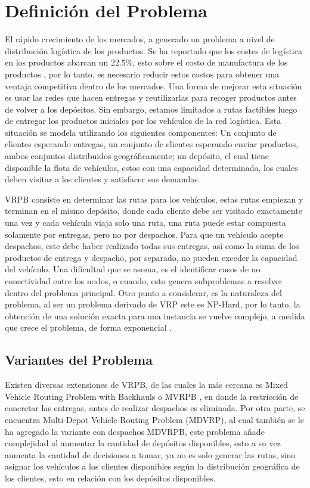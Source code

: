 \documentclass[letter, 10pt]{article}
\begin{document}
\section{Definición del Problema}
El rápido crecimiento de los mercados, a generado un problema a nivel de distribución logística de los productos. Se ha reportado que los costes de logística en los productos abarcan un 22.5\%, esto sobre el costo de manufactura de los productos \cite{kearney1984measuring}, por lo tanto, es necesario reducir estos costos para obtener una ventaja competitiva dentro de los mercados. Una forma de mejorar esta situación es usar las redes que hacen entregas y reutilizarlas para recoger productos antes de volver a los depósitos. Sin embargo, estamos limitados a rutas factibles luego de entregar los productos iniciales por los vehículos de la red logística. Esta situación se modela utilizando los siguientes componentes: Un conjunto de clientes esperando entregas, un conjunto de clientes esperando enviar productos, ambos conjuntos distribuidos geográficamente; un depósito, el cual tiene disponible la flota de vehículos, estos con una capacidad determinada, los cuales deben visitar a los clientes y satisfacer sus demandas.
\\\par
VRPB consiste en determinar las rutas para los vehículos, estas rutas empiezan y terminan en el mismo depósito, donde cada cliente debe ser visitado exactamente una vez y cada vehículo viaja solo una ruta, una ruta puede estar compuesta solamente por entregas, pero no por despachos. Para que un vehículo acepte despachos, este debe haber realizado todas sus entregas, así como la suma de los productos de entrega y despacho, por separado, no pueden exceder la capacidad del vehículo. Una dificultad que se asoma, es el identificar casos de no conectividad entre los nodos, o cuando, esto genera subproblemas a resolver dentro del problema principal. Otro punto a considerar, es la naturaleza del problema, al ser un problema derivado de VRP este es NP-Hard, por lo tanto, la obtención de una solución exacta para una instancia se vuelve complejo, a medida que crece el problema, de forma exponencial \cite{lenstra1981complexity}.


\subsection{Variantes del Problema}
Existen diversas extensiones de VRPB, de las cuales la más cercana es Mixed Vehicle Routing Problem with Backhauls o MVRPB \cite{wade2002investigation}, en donde la restricción de concretar las entregas, antes de realizar despachos es eliminada. Por otra parte, se encuentra Multi-Depot Vehicle Routing Problem (MDVRP)\cite{crevier2007multi}, al cual también se le ha agregado la variante con despachos MDVRPB, este problema añade complejidad al aumentar la cantidad de depósitos disponibles, esto a su vez aumenta la cantidad de decisiones a tomar, ya no es solo generar las rutas, sino asignar los vehículos a los clientes disponibles según la distribución geográfica de los clientes, esto en relación con los depósitos disponibles.
\end{document}
